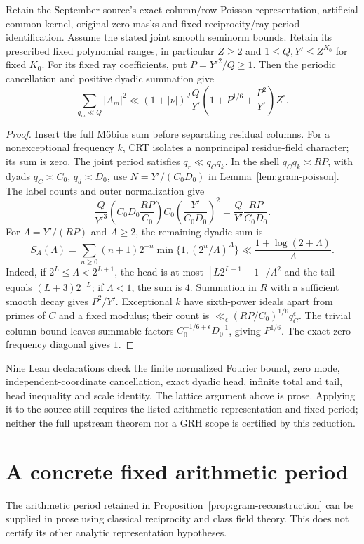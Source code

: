 \begin{proposition}\label{prop:gram-reconstruction}
Retain the September source's exact column/row Poisson representation,
artificial common kernel, original zero masks and fixed reciprocity/ray
period identification. Assume the stated joint smooth seminorm bounds.
Retain its prescribed fixed polynomial ranges, in particular
$Z\ge2$ and $1\le Q,Y'\le Z^{K_0}$ for fixed $K_0$.
For its fixed ray coefficients, put $P=Y'^2/Q\ge1$. Then the periodic
cancellation and positive dyadic summation give
\[
 \sum_{q_m\ll Q}|A_m|^2
 \ll (1+|\nu|)^J\frac Q{Y'}
       \left(1+P^{1/6}+\frac{P^2}{Y'}\right)Z^\epsilon.
\]
\end{proposition}
\begin{proof}
Insert the full M\"obius sum before separating residual columns.
For a nonexceptional frequency $k$, CRT isolates a nonprincipal
residue-field character; its sum is zero. The joint period satisfies
$q_r\ll q_Cq_k$. In the shell $q_Cq_k\asymp RP$, with dyads
$q_C\asymp C_0$, $q_d\asymp D_0$, use
$N=Y'/(C_0D_0)$ in Lemma~\ref{lem:gram-poisson}.
The label counts and outer normalization give
\[
 \frac Q{Y'^3}\left(C_0D_0\frac{RP}{C_0}\right)C_0
       \left(\frac{Y'}{C_0D_0}\right)^2
 =\frac Q{Y'}\frac{RP}{C_0D_0}.
\]
For $\Lambda=Y'/(RP)$ and $A\ge2$, the remaining dyadic sum is
\[
 S_A(\Lambda)=\sum_{n\ge0}(n+1)2^{-n}
       \min\{1,(2^n/\Lambda)^A\}
 \ll\frac{1+\log(2+\Lambda)}{\Lambda}.
\]
Indeed, if $2^L\le\Lambda<2^{L+1}$, the head is at most
$[L2^{L+1}+1]/\Lambda^2$ and the tail equals $(L+3)2^{-L}$;
if $\Lambda<1$, the sum is $4$. Summation in $R$ with a sufficient
smooth decay gives $P^2/Y'$. Exceptional $k$ have sixth-power ideals
apart from primes of $C$ and a fixed modulus; their count is
$\ll_\epsilon(RP/C_0)^{1/6}q_C^\epsilon$.
The trivial column bound leaves summable factors
$C_0^{-1/6+\epsilon}D_0^{-1}$, giving $P^{1/6}$.
The exact zero-frequency diagonal gives $1$.
\end{proof}

Nine Lean declarations check the finite normalized Fourier bound,
zero mode, independent-coordinate cancellation, exact dyadic head,
infinite total and tail, head inequality and scale identity.
The lattice argument above is prose. Applying it to the source still
requires the listed arithmetic representation and fixed period; neither
the full upstream theorem nor a GRH scope is certified by this reduction.

\section{A concrete fixed arithmetic period}
The arithmetic period retained in Proposition~\ref{prop:gram-reconstruction}
can be supplied in prose using classical reciprocity and class field theory.
This does not certify its other analytic representation hypotheses.

